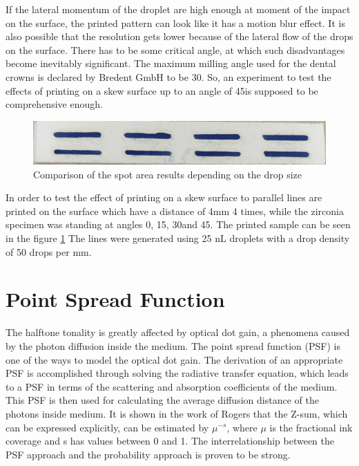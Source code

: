If the lateral momentum of the droplet are high enough at moment of the impact on the surface, the printed pattern can look like it has a motion blur effect. It is also possible that the resolution gets lower because of the lateral flow of the drops on the surface. There has to be some critical angle, at which such disadvantages become inevitably  significant. The maximum milling angle used for the dental crowns is declared by Bredent GmbH to be 30\textdegree. So, an experiment to test the effects of printing on a skew surface up to an angle of 45\textdegree is supposed to be comprehensive enough.

	\bigskip

	\begin{figure}[H]
		\centering
		\includegraphics[width=1\textwidth]{grafiken/angleprint.jpg}
		\caption{Comparison of the spot area results depending on the drop size}
		\label{fig:angleprint}
	\end{figure} 

	\bigskip

In order to test the effect of printing on a skew surface to parallel lines are printed on the surface which have a distance of 4mm 4 times, while the zirconia specimen was standing at angles 0\textdegree, 15\textdegree, 30\textdegree and 45\textdegree. The printed sample can be seen in the figure \ref{fig:angleprint}
The lines were generated using 25 nL droplets with a drop density of 50 drops per mm.

\section{Point Spread Function}


The halftone tonality is greatly affected by optical dot gain, a phenomena caused by the photon diffusion inside the medium. The point spread function (PSF) is one of the ways to model the optical dot gain. The derivation of an appropriate PSF is accomplished through solving the radiative transfer equation, which leads to a PSF in terms of the scattering and absorption coefficients of the medium. This PSF is then used for calculating the average diffusion distance of the photons inside medium. It is shown in the work of Rogers that the Z-sum, which can be expressed explicitly, can be estimated by $\mu^{-s}$, where $\mu$ is the fractional ink coverage and s has values between 0 and 1.  The interrelationship  between the PSF  approach and the probability approach is proven to be strong. \citep{rogers2015point}

